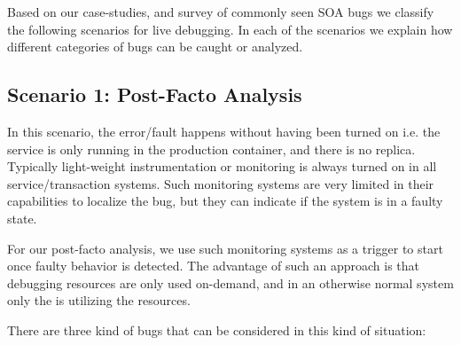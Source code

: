 Based on our case-studies, and survey of commonly seen SOA bugs we classify the following scenarios for live debugging. 
In each of the scenarios we explain how different categories of bugs can be caught or analyzed.

\subsection{Scenario 1: Post-Facto Analysis}
\label{sec:activePostFactoAnalysis}

In this scenario, the error/fault happens without \livedebugging having been turned on i.e. the service is only running in the production container, and there is no replica.
Typically light-weight instrumentation or monitoring is always turned on in all service/transaction systems. 
Such monitoring systems are very limited in their capabilities to localize the bug, but they can indicate if the system is in a faulty state.

For our post-facto analysis, we use such monitoring systems as a trigger to start \livedebugging once faulty behavior is detected. 
The advantage of such an approach is that debugging resources are only used on-demand, and in an otherwise normal system only the \productioncontainer is utilizing the resources.


There are three kind of bugs that can be considered in this kind of situation:

